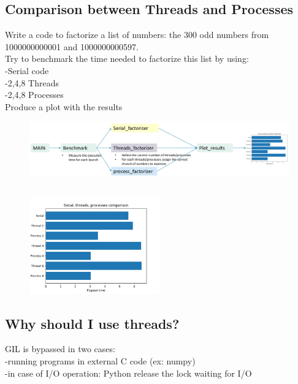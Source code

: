 \inputminted{python}{python_parallel/thread2.py}
\inputminted{python}{python_parallel/thread2b.py}


\subsection{Comparison between Threads and Processes}

Write a code to factorize a list of numbers: the 300 odd numbers from 1000000000001 and 1000000000597.\\

Try to benchmark the time needed to factorize this list by using:\\
-Serial code\\
-2,4,8 Threads\\
-2,4,8 Processes\\
Produce a plot with the results


\begin{figure}[ht]
	\centering
	\includegraphics[width=1\textwidth]{figure_parallel/comparison_thread_processes.png}\end{figure}
\FloatBarrier


\inputminted{python}{python_parallel/final_example.py}


\begin{figure}[ht]
	\centering
	\includegraphics[width=0.5\textwidth]{figure_parallel/comparison_time.png}\end{figure}
\FloatBarrier

\subsection{Why should I use threads?}
GIL is bypassed in two cases:\\
-running programs in external C code (ex: numpy)\\
-in case of I/O operation: Python release the lock waiting for I/O\\

